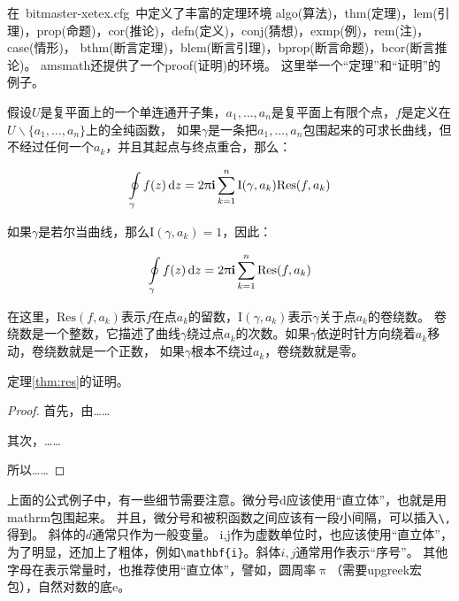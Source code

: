 在~bitmaster-xetex.cfg~中定义了丰富的定理环境
algo(算法)，thm(定理)，lem(引理)，prop(命题)，cor(推论)，defn(定义)，conj(猜想)，exmp(例)，rem(注)，case(情形)，
bthm(断言定理)，blem(断言引理)，bprop(断言命题)，bcor(断言推论)。
amsmath还提供了一个proof(证明)的环境。
这里举一个``定理''和``证明''的例子。
\begin{thm}[留数定理]
\label{thm:res}
  假设$U$是复平面上的一个单连通开子集，$a_1,\ldots,a_n$是复平面上有限个点，$f$是定义在$U\backslash \{a_1,\ldots,a_n\}$上的全纯函数，
  如果$\gamma$是一条把$a_1,\ldots,a_n$包围起来的可求长曲线，但不经过任何一个$a_k$，并且其起点与终点重合，那么：

  \begin{equation}
    \label{eq:res}
    \ointop_{\gamma}f(z)\,\mathrm{d}z = 2\uppi\mathbf{i}\sum^n_{k=1}\mathrm{I}(\gamma,a_k)\mathrm{Res}(f,a_k)
  \end{equation}

  如果$\gamma$是若尔当曲线，那么$\mathrm{I}(\gamma, a_k)=1$，因此：

  \begin{equation}
    \label{eq:resthm}
    \ointop_{\gamma}f(z)\,\mathrm{d}z = 2\uppi\mathbf{i}\sum^n_{k=1}\mathrm{Res}(f,a_k)
  \end{equation}


  在这里，$\mathrm{Res}(f, a_k)$表示$f$在点$a_k$的留数，$\mathrm{I}(\gamma,a_k)$表示$\gamma$关于点$a_k$的卷绕数。
  卷绕数是一个整数，它描述了曲线$\gamma$绕过点$a_k$的次数。如果$\gamma$依逆时针方向绕着$a_k$移动，卷绕数就是一个正数，
  如果$\gamma$根本不绕过$a_k$，卷绕数就是零。

  定理\ref{thm:res}的证明。
  
  \begin{proof}
    首先，由……

    其次，……

    所以……
  \end{proof}
  
\end{thm}

上面的公式例子中，有一些细节需要注意。微分号d应该使用``直立体''，也就是用mathrm包围起来。
并且，微分号和被积函数之间应该有一段小间隔，可以插入\verb+\,+得到。
斜体的$d$通常只作为一般变量。
i,j作为虚数单位时，也应该使用``直立体''，为了明显，还加上了粗体，例如\verb+\mathbf{i}+。斜体$i,j$通常用作表示``序号''。
其他字母在表示常量时，也推荐使用``直立体''，譬如，圆周率$\uppi$（需要upgreek宏包），自然对数的底$\mathrm{e}$。


